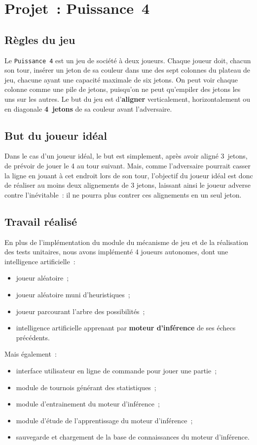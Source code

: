 \chapter{Projet~: Puissance~4}

\section{Règles du jeu}
Le \texttt{Puissance~4} est un jeu de société à deux joueurs. Chaque joueur doit,
chacun son tour, insérer un jeton de sa couleur dans une des sept colonnes
du plateau de jeu, chacune ayant une capacité maximale de six jetons. On peut voir chaque colonne comme
une pile de jetons, puisqu'on ne peut qu'empiler des jetons les uns sur les autres.
Le but du jeu est d'\textbf{aligner} verticalement, horizontalement ou en diagonale \textbf{4~jetons} de sa couleur avant l'adversaire.


\section{But du joueur idéal}

Dans le cas d'un joueur idéal, le but est simplement, après avoir aligné 3~jetons,
de prévoir de jouer le 4 au tour suivant. Mais, comme l'adversaire pourrait casser la ligne en jouant à cet endroit
lors de son tour, l'objectif du joueur idéal est donc de réaliser au moins deux alignements de 3 jetons,
laissant ainsi le joueur adverse contre l'inévitable~: il ne pourra plus contrer ces alignements en un seul jeton.


\section{Travail réalisé}

En plus de l'implémentation du module du mécanisme de jeu et de la réalisation des
tests unitaires, nous avons implémenté 4 joueurs autonomes, dont une intelligence artificielle~:
\begin{itemize}

    \item joueur aléatoire~;
    \item joueur aléatoire muni d'heuristiques~;
    \item joueur parcourant l'arbre des possibilités~;
    \item intelligence artificielle apprenant par \textbf{moteur d'inférence} de ses
    échecs précédents.\\
\end{itemize}

Mais également~:
\begin{itemize}
    \item interface utilisateur en ligne de commande pour jouer une partie~;
    \item module de tournois générant des statistiques~;
    \item module d'entrainement du moteur d'inférence~;
    \item module d'étude de l'apprentissage du moteur d'inférence~;
    \item sauvegarde et chargement de la base de connaissances du moteur d'inférence.
\end{itemize}
